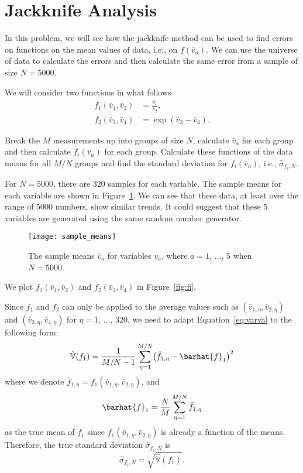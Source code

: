 \section{Jackknife Analysis}\label{sec:ja}

In this problem, we will see how the jackknife method can be used to find errors on functions
on the mean values of data, i.e., on \(f(\bar{v}_a)\).
We can use the universe of data to calculate
the errors and then calculate the same error from a sample of size \(N = 5000\).

We will consider two functions in what follows
%
\begin{align}
    f_1(\bar{v}_1, \bar{v}_2) & = \frac{ \bar{v}_1 }{ \bar{v}_2 }, \\
    f_2(\bar{v}_3, \bar{v}_4) & = \exp( \bar{v}_3 - \bar{v}_4 ).
\end{align}

 Break the \(M\) measurements up into groups of size \(N\), calculate
\(\bar{v}_a\) for each group and then calculate \(f_i(\bar{v}_a)\) for each group.
Calculate these functions of the data means for all \(M/N\) groups and find the
standard deviation for \(f_i(\bar{v}_a)\), i.e., \(\hat{\sigma}_{f_i,N}\).

\Answer{}
For \(N = 5000\), there are \(320\) samples for each variable.
The sample means for each variable are shown in Figure~\ref{fig:sample_means}.
We can see that these data, at least over the range of \(5000\) numbers,
show similar trends.
It could suggest that these \(5\) variables are generated using the same random
number generator.

\begin{figure}[h]
    \centering
    \texttt{[image: sample\_means]}
    \caption{The sample means \(\bar{v}_a\) for variables \(v_a\), where
        \(a = 1\), \(\ldots\), \(5\) when \(N = 5000\).}
    \label{fig:sample_means}
\end{figure}

We plot \(f_1(\bar{v}_1, \bar{v}_2)\) and \(f_2(\bar{v}_3, \bar{v}_4)\) in
Figure~\ref{fig:fi}.

Since \(f_1\) and \(f_2\) can only be applied to the average values such as
\((\bar{v}_{1,\eta}, \bar{v}_{2,\eta})\) and \((\bar{v}_{3,\eta}, \bar{v}_{4,\eta})\)
for \(\eta = 1\), \(\ldots\), \(320\), we need to adapt Equation~\eqref{eq:varva}
to the following form:
%
\begin{equation}
    \hat{\mathbb{V}}(f_1) = \frac{ 1 }{ M / N - 1 }
    \sum_{\eta=1}^{M/N} \bigl( \bar{f}_{1,\eta} - \barhat{f}_1 \bigr)^2
\end{equation}
%
where we denote \(\bar{f}_{1,\eta} = f_1(\bar{v}_{1,\eta}, \bar{v}_{2,\eta})\),
and
%
\begin{equation}
    \barhat{f}_1 = \frac{ N }{ M } \sum_{\eta=1}^{M/N} \bar{f}_{1,\eta}
\end{equation}
as the true mean of \(f_1\)
since \(f_1(\bar{v}_{1,\eta}, \bar{v}_{2,\eta})\) is already a function of the means.
Therefore, the true standard deviation \(\hat{\sigma}_{f_i,N}\) is
%
\begin{equation}
    \hat{\sigma}_{f_i,N} = \sqrt{\hat{\mathbb{V}}(f_1)}.
\end{equation}

